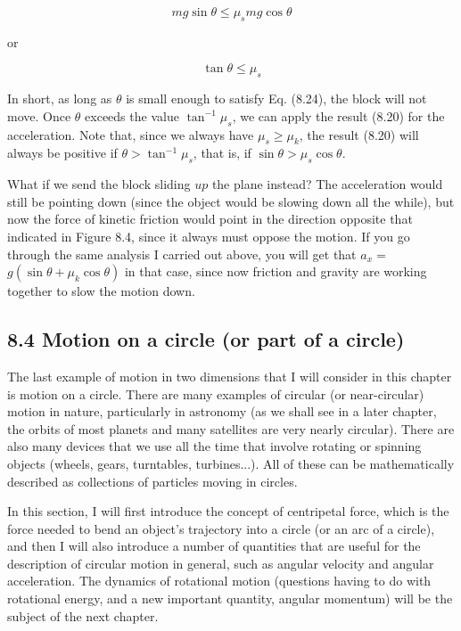 \documentclass[10pt]{article}
\begin{document}
\begin{equation*}
m g \sin \theta \leq \mu_{s} m g \cos \theta \tag{8.23}
\end{equation*}


or


\begin{equation*}
\tan \theta \leq \mu_{s} \tag{8.24}
\end{equation*}


In short, as long as $\theta$ is small enough to satisfy Eq. (8.24), the block will not move. Once $\theta$ exceeds the value $\tan ^{-1} \mu_{s}$, we can apply the result (8.20) for the acceleration. Note that, since we always have $\mu_{s} \geq \mu_{k}$, the result (8.20) will always be positive if $\theta>\tan ^{-1} \mu_{s}$, that is, if $\sin \theta>\mu_{s} \cos \theta$.

What if we send the block sliding $u p$ the plane instead? The acceleration would still be pointing down (since the object would be slowing down all the while), but now the force of kinetic friction would point in the direction opposite that indicated in Figure 8.4, since it always must oppose the motion. If you go through the same analysis I carried out above, you will get that $a_{x}=$ $g\left(\sin \theta+\mu_{k} \cos \theta\right)$ in that case, since now friction and gravity are working together to slow the motion down.

\subsection*{8.4 Motion on a circle (or part of a circle)}
The last example of motion in two dimensions that I will consider in this chapter is motion on a circle. There are many examples of circular (or near-circular) motion in nature, particularly in astronomy (as we shall see in a later chapter, the orbits of most planets and many satellites are very nearly circular). There are also many devices that we use all the time that involve rotating or spinning objects (wheels, gears, turntables, turbines...). All of these can be mathematically described as collections of particles moving in circles.

In this section, I will first introduce the concept of centripetal force, which is the force needed to bend an object's trajectory into a circle (or an arc of a circle), and then I will also introduce a number of quantities that are useful for the description of circular motion in general, such as angular velocity and angular acceleration. The dynamics of rotational motion (questions having to do with rotational energy, and a new important quantity, angular momentum) will be the subject of the next chapter.
\end{document}
